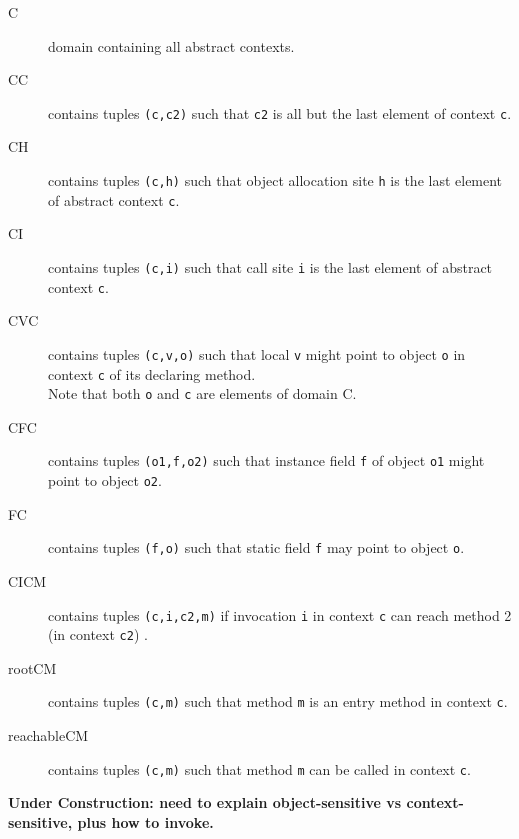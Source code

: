 \begin{description}
\item[C] domain containing all abstract contexts.
\item[CC] contains tuples \texttt{(c,c2)} such that \texttt{c2} is all but the last element of context \texttt{c}.
\item[CH] contains tuples \texttt{(c,h)} such that object allocation site \texttt{h} is the last element of abstract context \texttt{c}.
\item[CI] contains tuples \texttt{(c,i)} such that call site \texttt{i} is the last element of abstract context \texttt{c}.
\item[CVC] contains tuples \texttt{(c,v,o)} such that local \texttt{v} might point to object \texttt{o} in context \texttt{c} of its declaring method.  \\
Note that both \texttt{o} and \texttt{c} are elements of domain C.
\item[CFC] contains tuples \texttt{(o1,f,o2)} such that instance field \texttt{f} of object \texttt{o1} might point to object \texttt{o2}.
\item[FC] contains tuples \texttt{(f,o)} such that static field \texttt{f} may point to object \texttt{o}.
\item[CICM] contains tuples \texttt{(c,i,c2,m)} if invocation \texttt{i} in context \texttt{c} can reach method 2 (in context \texttt{c2}) .
\item[rootCM] contains tuples \texttt{(c,m)} such that method \texttt{m} is an entry method in context \texttt{c}.
\item[reachableCM] contains tuples \texttt{(c,m)} such that method \texttt{m} can be called in context \texttt{c}.
\end{description}


{\bf Under Construction: need to explain object-sensitive vs context-sensitive, plus how to invoke.}
